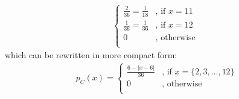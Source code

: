 \begin{enumerate}[label=\alph*.]
\begin{align*}
\begin{cases}
\frac{2}{36} = \frac{1}{18} &\text{, if } x = 11\\
\frac{1}{36} = \frac{1}{36} &\text{, if } x = 12\\
0 &\text{, otherwise } \\
\end{cases}
\end{align*}
which can be rewritten in more compact form:
\begin{align*}
p_C(x) = \begin{cases}
\frac{6 - |x-6|}{36} &\text{, if } x = \{ 2, 3, \ldots, 12\}\\
0 &\text{, otherwise } \\
\end{cases}
\end{align*}
\end{enumerate}

\paragraph{}

